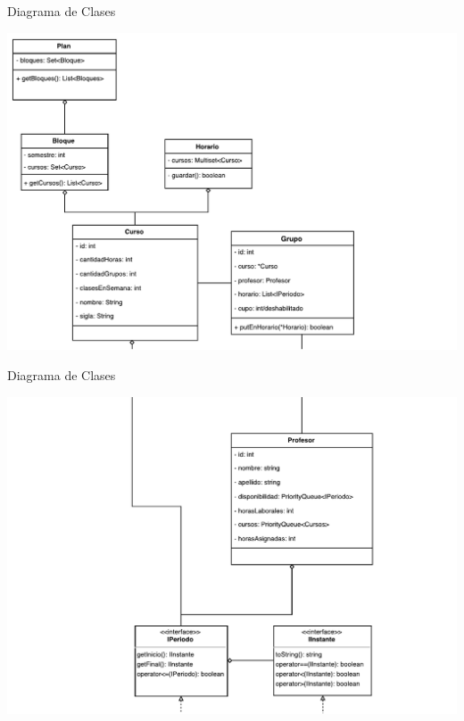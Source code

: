 \documentclass[10pt]{beamer}
\begin{document}
\begin{frame}{Diagrama de Clases}
\begin{center}
    \includegraphics[width=\textwidth]{diagramaClases1}
\end{center}
\end{frame}

\begin{frame}{Diagrama de Clases}
\begin{center}
    \includegraphics[width=\textwidth]{diagramaClases2}
\end{center}
\end{frame}
\end{document}
